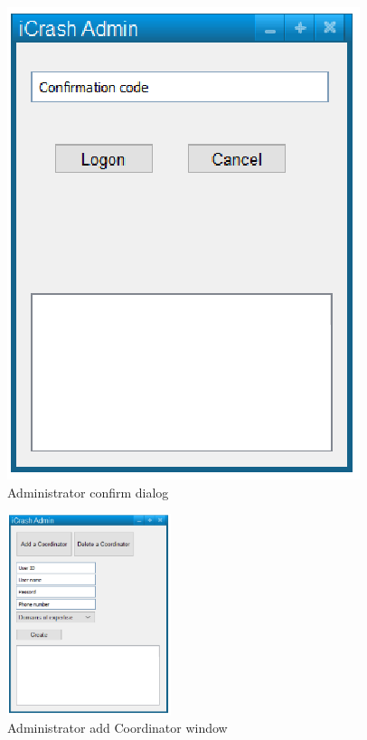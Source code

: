 \begin{figure}
  \centering
    \includegraphics{images/mockups/feature1-login/AdminConfirm.eps}
  \caption{Administrator confirm dialog}
  \label{fig:AdminConfirm}
\end{figure}


\begin{figure}
  \centering
    \includegraphics[width=4.8cm]{images/mockups/feature1-login/AdminAddCoordinator.eps}
  \caption{Administrator add Coordinator window}
  \label{fig:AdminAddCoordinator}
\end{figure}



